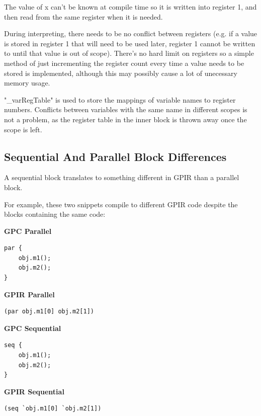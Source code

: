 The value of x can't be known at compile time so it is written into register 1,
and then read from the same register when it is needed.

During interpreting, there needs to be no conflict between registers (e.g. if a value
is stored in register 1 that will need to be used later, register 1 cannot be written to
until that value is out of scope). There's no hard limit on registers so a simple
method of just incrementing the register count every time a value needs to be stored
is implemented, although this may possibly cause a lot of unecessary memory usage.

"\_varRegTable" is used to store the mappings of variable names to register numbers. 
Conflicts between variables with the same name in different scopes is not a problem,
as the register table in the inner block is thrown away once the scope is left.

\subsection{Sequential And Parallel Block Differences}
A sequential block translates to something different in GPIR than a parallel block.

For example, these two snippets compile to different GPIR code despite
the blocks containing the same code:\\


\begin{minipage}{.48\textwidth}
\center \textbf{GPC Parallel}
\begin{lstlisting}[style=myGPC, frame=single]
par {
    obj.m1();
    obj.m2();
}
\end{lstlisting}

\center \textbf{GPIR Parallel}
\begin{lstlisting}[style=myGPIR, frame=single]
(par obj.m1[0] obj.m2[1])
\end{lstlisting}
\end{minipage}
\hfill
%
%
\begin{minipage}{.48\textwidth}
\center \textbf{GPC Sequential}
\begin{lstlisting}[style=myGPC, frame=single]
seq {
    obj.m1();
    obj.m2();
}
\end{lstlisting}

\center \textbf{GPIR Sequential}
\begin{lstlisting}[style=myGPIR, frame=single]
(seq `obj.m1[0] `obj.m2[1])
\end{lstlisting}
\end{minipage}
 
